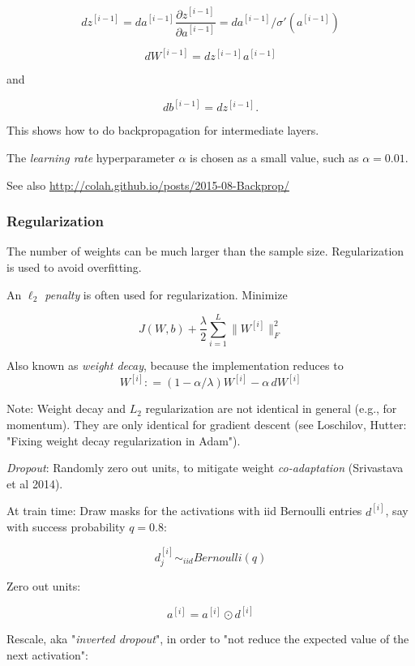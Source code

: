 \documentclass[english]{article}
\begin{document}
$$d z^{[i-1]} 
= d a^{[i-1]}\frac{\partial  z^{[i-1]}}{\partial  a^{[i-1]}} = d a^{[i-1]}/ \sigma' (a^{[i-1]})$$

$$d W^{[i-1]} 
= d z^{[i-1]} a^{[i-1]}$$

and

$$d b^{[i-1]} = d z^{[i-1]}.$$

This shows how to do backpropagation for intermediate layers. 
\eenum 
\item The \emph{learning rate} hyperparameter $\alpha$ is chosen as a small value, such as $\alpha = 0.01$. 

\item See also \url{http://colah.github.io/posts/2015-08-Backprop/}


\eenum 
\subsubsection{Regularization}

\benum
\item The number of weights can be much larger than the sample size. Regularization is used to avoid overfitting. 

\item 
An \emph{$\ell_2$ penalty} is often used for regularization. Minimize

$$J(W,b) + \frac{\lambda}{2} \sum_{i=1}^L \|W^{[i]} \|_F^2$$

Also known as \emph{weight decay}, because the implementation reduces to 
$$W^{[i]}: = (1-\alpha/\lambda) W^{[i]} - \alpha\, dW^{[i]}$$

Note: Weight decay and $L_2$ regularization are not identical in general (e.g., for momentum). They are only identical for gradient descent (see Loschilov, Hutter: "Fixing weight decay regularization in Adam"). 

\item 
\emph{Dropout}: Randomly zero out units, to mitigate weight \emph{co-adaptation} (Srivastava et al 2014). 

At train time:  Draw masks for the activations with iid Bernoulli entries  $d^{[i]}$, say with success probability $q=0.8$: 

$$ d^{[i]}_j \sim_{iid} Bernoulli(q)$$

Zero out units:

$$a^{[i]} = a^{[i]}\odot d^{[i]}$$

Rescale, aka "\emph{inverted dropout}", in order to "not reduce the expected value of the next activation": 
\end{document}
